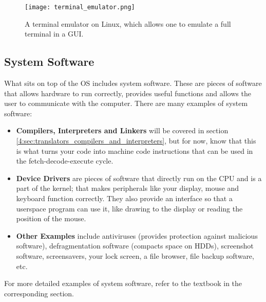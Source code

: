 \documentclass[../main.tex]{subfiles}
\begin{document}
\begin{figure}[H]
    \centering
    \texttt{[image: terminal\_emulator.png]}
    \caption{A terminal emulator on Linux, which allows one to emulate a full terminal in a GUI.}
    \label{fig:terminal_emulator}
\end{figure}

\subsection{System Software}

What sits on top of the OS includes system software. These are pieces of software that allows hardware to run correctly, provides useful functions and allows the user to communicate with the computer. There are many examples of system software:

\begin{itemize}
    \item \textbf{Compilers, Interpreters and Linkers} will be covered in section \ref{4:sec:translators_compilers_and_interpreters}, but for now, know that this is what turns your code into machine code instructions that can be used in the fetch-decode-execute cycle.
    \item \textbf{Device Drivers} are pieces of software that directly run on the CPU and is a part of the kernel; that makes peripherals like your display, mouse and keyboard function correctly. They also provide an interface so that a userspace program can use it, like drawing to the display or reading the position of the mouse.
    \item \textbf{Other Examples} include antiviruses (provides protection against malicious software), defragmentation software (compacts space on HDDs), screenshot software, screensavers, your lock screen, a file browser, file backup software, etc.
\end{itemize}

For more detailed examples of system software, refer to the textbook in the corresponding section.
\end{document}
